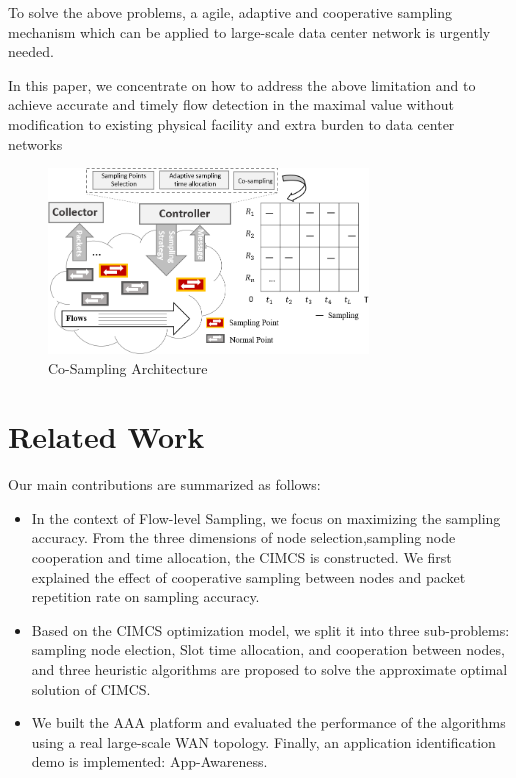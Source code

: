 \documentclass[conference]{IEEEtran}
\begin{document}
To solve the above problems, a agile, adaptive and cooperative sampling mechanism which can be applied to large-scale data center network is urgently needed. 

In this paper, we concentrate on how to address the above limitation and to achieve accurate and timely flow detection in the maximal value without modification to existing physical facility and extra burden to data center networks


\begin{figure}[!hhhhhhhhhht]
\centering
\includegraphics[width=8.5cm]{images/png_architecture.png}
\caption{Co-Sampling Architecture}
\label{Architecture}
\end{figure}

\section{Related Work}
Our main contributions are summarized as follows:
\begin{itemize}[leftmargin=*]
\setlength{\parindent}{0pt}

\item In the context of Flow-level Sampling, we focus on maximizing the sampling accuracy. From the three dimensions of  node selection,sampling node cooperation and time allocation, the CIMCS is constructed. We first explained the effect of cooperative sampling between nodes and packet repetition rate on sampling accuracy.
\item Based on the CIMCS optimization model, we split it into three sub-problems: sampling node election, Slot time allocation, and cooperation between nodes, and three heuristic algorithms are proposed to solve the approximate optimal solution of CIMCS.
\item We built the AAA platform and evaluated the performance of the algorithms using a real large-scale WAN topology. Finally, an application identification demo is implemented: App-Awareness.
\end{itemize}
\end{document}

